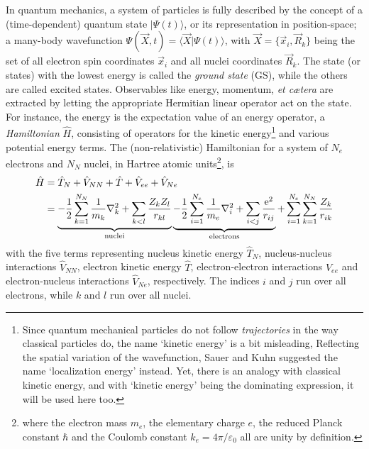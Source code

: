 \documentclass[11pt,bibliography=totoc,index=totoc]{scrbook}   %
\newcommand{\comment}[1]{\hl{#1}}
\begin{document}
In quantum mechanics, a system of particles is fully described by the concept of a (time-dependent) quantum state $|\Psi(t)\rangle$, 
or its representation in position-space; a many-body wavefunction $\Psi(\vec{X},t)=\langle\vec{X}|\Psi(t)\rangle$, with $\vec{X}=\{\vec{x}_i,\vec{R}_k\}$ being the set of all electron spin coordinates $\vec{x}_i$ and all nuclei coordinates $\vec{R}_k$.
The state (or states) with the lowest energy is called the \emph{ground state} (GS), while the others are called excited states. 
Observables like energy, momentum, \textit{et cætera} are extracted by letting the appropriate Hermitian linear operator act on the state. 
For instance, the energy is the expectation value of an energy operator, a \emph{Hamiltonian} $\hat{H}$, 
consisting of operators for the kinetic energy\footnote{Since quantum mechanical particles do not follow \emph{trajectories} in the way classical particles do, the name `kinetic energy' is a bit misleading, Reflecting the spatial variation of the wavefunction, Sauer and Kuhn suggested the name `localization energy' instead\cite{Sauer:1982}. Yet, there is an analogy with classical kinetic energy, and with `kinetic energy' being the dominating expression, it will be used here too.} and various potential energy terms.
The (non-relativistic) Hamiltonian for a system of $N_e$ electrons and $N_N$ nuclei, in Hartree atomic units\footnote{
where the electron mass $m_e$, the elementary charge $e$, the reduced Planck constant $\hbar$ and the Coulomb constant $k_e=4\pi/\varepsilon_0$ all are unity by definition.
}, is
\begin{align}
  \hat{H} &= \hat{T}_N + \hat{V}_{NN} + \hat{T} + \hat{V}_{ee} + \hat{V}_{Ne}\\
    &= \underbrace{
        - \frac{1}{2}\sum_{k=1}^{N_N} \frac{1}{m_k}\nabla_k^2 
        + \sum_{k<l}\frac{Z_kZ_l}{r_{kl}}
		}_{\text{nuclei}}
  \underbrace{
      -\frac{1}{2}\sum_{i=1}^{N_e}\frac{1}{m_e}\nabla_i^2
	+ \sum_{i<j}\frac{\mathrm{e}^2}{r_{ij}}
	}_{\text{electrons}}
    + \sum_{i=1}^{N_e}\sum_{k=1}^{N_N} \frac{Z_k}{r_{ik}}
  \label{eq:mol-hamiltonian}
\end{align}
with the five terms representing nucleus kinetic energy $\hat{T}_N$, nucleus-nucleus interactions $\hat{V}_{NN}$, electron kinetic energy $\hat{T}$, electron-electron interactions $\hat{V}_{ee}$ and electron-nucleus interactions $\hat{V}_{Ne}$, respectively.
The indices $i$ and $j$ run over all electrons, while $k$ and $l$ run over all nuclei. 
\end{document}
